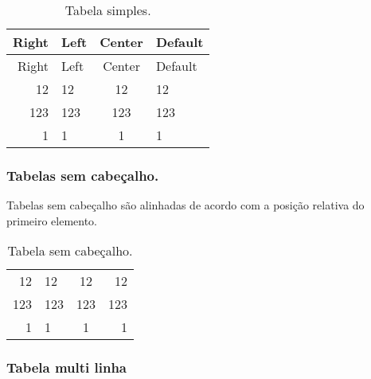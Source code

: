 \begin{longtable}[]{@{}rlcl@{}}
\caption{Tabela simples.}\tabularnewline
\toprule
Right & Left & Center & Default\tabularnewline
\midrule
\endfirsthead
\toprule
Right & Left & Center & Default\tabularnewline
\midrule
\endhead
12 & 12 & 12 & 12\tabularnewline
123 & 123 & 123 & 123\tabularnewline
1 & 1 & 1 & 1\tabularnewline
\bottomrule
\end{longtable}

\hypertarget{tabelas-sem-cabeuxe7alho.}{%
\subsubsection{Tabelas sem cabeçalho.}\label{tabelas-sem-cabeuxe7alho.}}

Tabelas sem cabeçalho são alinhadas de acordo com a posição relativa do
primeiro elemento.

\begin{longtable}[]{@{}rlcr@{}}
\caption{Tabela sem cabeçalho.}\tabularnewline
\toprule
\endhead
12 & 12 & 12 & 12\tabularnewline
123 & 123 & 123 & 123\tabularnewline
1 & 1 & 1 & 1\tabularnewline
\bottomrule
\end{longtable}

\hypertarget{tabela-multi-linha}{%
\subsubsection{Tabela multi linha}\label{tabela-multi-linha}}


